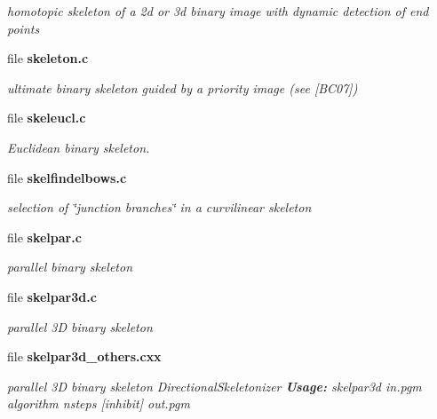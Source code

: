 \begin{DoxyCompactItemize}
\begin{DoxyCompactList}\small\item\em homotopic skeleton of a 2d or 3d binary image with dynamic detection of end points \item\end{DoxyCompactList}

\item 
file {\bf skeleton.c}


\begin{DoxyCompactList}\small\item\em ultimate binary skeleton guided by a priority image (see [BC07]) \item\end{DoxyCompactList}

\item 
file {\bf skeleucl.c}


\begin{DoxyCompactList}\small\item\em Euclidean binary skeleton. \item\end{DoxyCompactList}

\item 
file {\bf skelfindelbows.c}


\begin{DoxyCompactList}\small\item\em selection of \char`\"{}junction branches\char`\"{} in a curvilinear skeleton \item\end{DoxyCompactList}

\item 
file {\bf skelpar.c}


\begin{DoxyCompactList}\small\item\em parallel binary skeleton \item\end{DoxyCompactList}

\item 
file {\bf skelpar3d.c}


\begin{DoxyCompactList}\small\item\em parallel 3D binary skeleton \item\end{DoxyCompactList}

\item 
file {\bf skelpar3d\_\-others.cxx}


\begin{DoxyCompactList}\small\item\em parallel 3D binary skeleton DirectionalSkeletonizer {\bfseries Usage:} skelpar3d in.pgm algorithm nsteps [inhibit] out.pgm \item\end{DoxyCompactList}


\end{DoxyCompactItemize}
